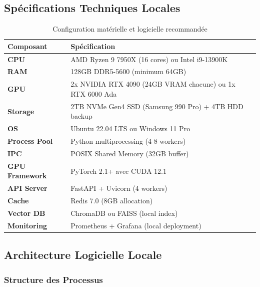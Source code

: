 \documentclass[12pt,a4paper]{article}
\begin{document}
\subsection{Spécifications Techniques Locales}

\begin{table}[H]
\centering
\begin{tabular}{|l|p{8cm}|}
\hline
\textbf{Composant} & \textbf{Spécification} \\
\hline
\textbf{CPU} & AMD Ryzen 9 7950X (16 cores) ou Intel i9-13900K \\
\hline
\textbf{RAM} & 128GB DDR5-5600 (minimum 64GB) \\
\hline
\textbf{GPU} & 2x NVIDIA RTX 4090 (24GB VRAM chacune) ou 1x RTX 6000 Ada \\
\hline
\textbf{Storage} & 2TB NVMe Gen4 SSD (Samsung 990 Pro) + 4TB HDD backup \\
\hline
\textbf{OS} & Ubuntu 22.04 LTS ou Windows 11 Pro \\
\hline
\textbf{Process Pool} & Python multiprocessing (4-8 workers) \\
\hline
\textbf{IPC} & POSIX Shared Memory (32GB buffer) \\
\hline
\textbf{GPU Framework} & PyTorch 2.1+ avec CUDA 12.1 \\
\hline
\textbf{API Server} & FastAPI + Uvicorn (4 workers) \\
\hline
\textbf{Cache} & Redis 7.0 (8GB allocation) \\
\hline
\textbf{Vector DB} & ChromaDB ou FAISS (local index) \\
\hline
\textbf{Monitoring} & Prometheus + Grafana (local deployment) \\
\hline
\end{tabular}
\caption{Configuration matérielle et logicielle recommandée}
\end{table}

\subsection{Architecture Logicielle Locale}

\subsubsection{Structure des Processus}
\end{document}
